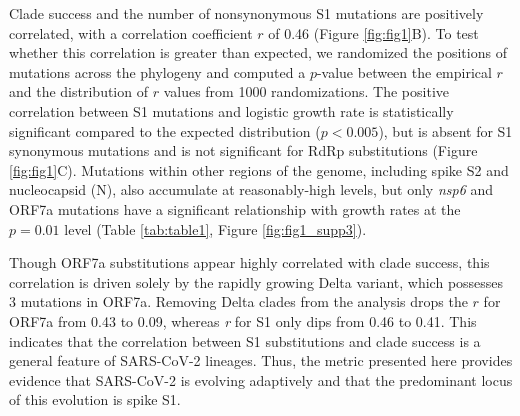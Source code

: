 \documentclass[11pt,oneside,letterpaper]{article}
\begin{document}
Clade success and the number of nonsynonymous S1 mutations are positively correlated, with a correlation coefficient $r$ of 0.46 (Figure \ref{fig:fig1}B). To test whether this correlation is greater than expected, we randomized the positions of mutations across the phylogeny and computed a $p$-value between the empirical $r$ and the distribution of $r$ values from 1000 randomizations. The positive correlation between S1 mutations and logistic growth rate is statistically significant compared to the expected distribution ($p<0.005$), but is absent for S1 synonymous mutations and is not significant for RdRp substitutions (Figure \ref{fig:fig1}C). Mutations within other regions of the genome, including spike S2 and nucleocapsid (N), also accumulate at reasonably-high levels, but only \emph{nsp6} and ORF7a mutations have a significant relationship with growth rates at the $p=0.01$ level (Table \ref{tab:table1}, Figure \ref{fig:fig1_supp3}).

Though ORF7a substitutions appear highly correlated with clade success, this correlation is driven solely by the rapidly growing Delta variant, which possesses 3 mutations in ORF7a. Removing Delta clades from the analysis drops the $r$ for ORF7a from 0.43 to 0.09, whereas \emph{r} for S1 only dips from 0.46 to 0.41. This indicates that the correlation between S1 substitutions and clade success is a general feature of SARS-CoV-2 lineages. Thus, the metric presented here provides evidence that SARS-CoV-2 is evolving adaptively and that the predominant locus of this evolution is spike S1.
\end{document}
